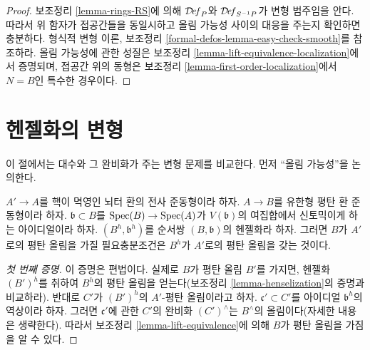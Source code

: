 \begin{proof}
보조정리 \ref{lemma-rings-RS}에 의해 $\mathcal{D}\!\mathit{ef}_P$와
$\mathcal{D}\!\mathit{ef}_{S^{-1}P}$가 변형 범주임을 안다. 따라서 위 함자가
접공간들을 동일시하고 올림 가능성 사이의 대응을 주는지 확인하면
충분하다. 형식적 변형 이론, 보조정리
\ref{formal-defos-lemma-easy-check-smooth}를 참조하라. 올림 가능성에 관한
성질은 보조정리 \ref{lemma-lift-equivalence-localization}에서 증명되며,
접공간 위의 동형은 보조정리 \ref{lemma-first-order-localization}에서
$N = B$인 특수한 경우이다.
\end{proof}



\section{헨젤화의 변형}
\label{section-compare-henselization}

\noindent
이 절에서는 대수와 그 완비화가 주는 변형 문제를 비교한다.%
먼저 ``올림 가능성''을 논의한다.

\begin{lemma}
\label{lemma-lift-equivalence-henselization}
$A' \to A$를 핵이 멱영인 뇌터 환의 전사 준동형이라 하자.
$A \to B$를 유한형 평탄 환 준동형이라 하자.
$\mathfrak b \subset B$를 $\mathop{\mathrm{Spec}}(B) \to \mathop{\mathrm{Spec}}(A)$가
$V(\mathfrak b)$의 여집합에서 신토믹이게 하는 아이디얼이라 하자.
$(B^h, \mathfrak b^h)$를 순서쌍 $(B, \mathfrak b)$의 헨젤화라 하자.
그러면 $B$가 $A'$로의 평탄 올림을 가질 필요충분조건은 $B^h$가
$A'$로의 평탄 올림을 갖는 것이다.
\end{lemma}

\begin{proof}[첫 번째 증명]
이 증명은 편법이다. 실제로 $B$가 평탄 올림 $B'$를 가지면, 헨젤화
$(B')^h$를 취하여 $B^h$의 평탄 올림을 얻는다(보조정리
\ref{lemma-henselization}의 증명과 비교하라). 반대로 $C'$가
$(B')^h$의 $A'$-평탄 올림이라고 하자.%
$\mathfrak c' \subset C'$를 아이디얼 $\mathfrak b^h$의 역상이라 하자.
그러면 $\mathfrak c'$에 관한 $C'$의 완비화 $(C')^\wedge$는
$B^\wedge$의 올림이다(자세한 내용은 생략한다). 따라서 보조정리
\ref{lemma-lift-equivalence}에 의해 $B$가 평탄 올림을 가짐을 알 수 있다.
\end{proof}

